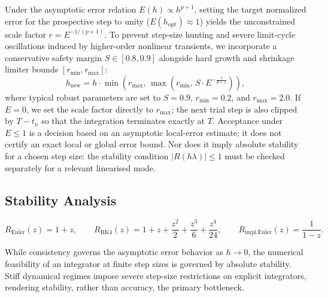 Under the asymptotic error relation $E(h) \propto h^{p+1}$, setting the target normalized error for the prospective step to unity ($E(h_{\text{opt}}) \approx 1$) yields the unconstrained scale factor $r = E^{-1/(p+1)}$. To prevent step-size hunting and severe limit-cycle oscillations induced by higher-order nonlinear transients, we incorporate a conservative safety margin $S \in [0.8, 0.9]$ alongside hard growth and shrinkage limiter bounds $[r_{\min}, r_{\max}]$:
\begin{equation}
\label{eq:step_update_formula}
h_{\text{new}} = h \cdot \min\left(r_{\max}, \, \max\left(r_{\min}, \, S \cdot E^{-\frac{1}{p+1}}\right)\right),
\end{equation}
where typical robust parameters are set to $S = 0.9$, $r_{\min} = 0.2$, and $r_{\max} = 2.0$. If $E=0$, we set the scale factor directly to $r_{\max}$; the next trial step is also clipped by $T-t_n$ so that the integration terminates exactly at $T$.
Acceptance under $E\leq1$ is a decision based on an asymptotic local-error estimate; it does not certify an exact local or global error bound. Nor does it imply absolute stability for a chosen step size: the stability condition $|R(h\lambda)|\leq1$ must be checked separately for a relevant linearised mode.

\subsection{Stability Analysis}
\label{sec:stability_analysis}

\begin{equation}
    R_{\text{Euler}}(z) = 1 + z, \qquad
    R_{\text{RK4}}(z) = 1 + z + \frac{z^2}{2} + \frac{z^3}{6} + \frac{z^4}{24},
    \qquad
    R_{\text{impl.Euler}}(z) = \frac{1}{1 - z}.
\end{equation}

While consistency governs the asymptotic error behavior as $h \to 0$, the numerical feasibility of an integrator at finite step sizes is governed by absolute stability. Stiff dynamical regimes impose severe step-size restrictions on explicit integrators, rendering stability, rather than accuracy, the primary bottleneck.

